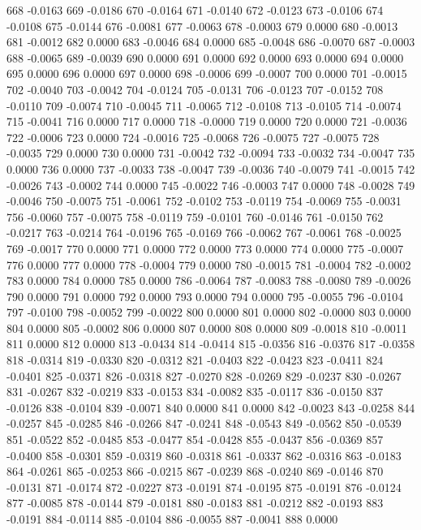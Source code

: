 668 -0.0163
669 -0.0186
670 -0.0164
671 -0.0140
672 -0.0123
673 -0.0106
674 -0.0108
675 -0.0144
676 -0.0081
677 -0.0063
678 -0.0003
679 0.0000
680 -0.0013
681 -0.0012
682 0.0000
683 -0.0046
684 0.0000
685 -0.0048
686 -0.0070
687 -0.0003
688 -0.0065
689 -0.0039
690 0.0000
691 0.0000
692 0.0000
693 0.0000
694 0.0000
695 0.0000
696 0.0000
697 0.0000
698 -0.0006
699 -0.0007
700 0.0000
701 -0.0015
702 -0.0040
703 -0.0042
704 -0.0124
705 -0.0131
706 -0.0123
707 -0.0152
708 -0.0110
709 -0.0074
710 -0.0045
711 -0.0065
712 -0.0108
713 -0.0105
714 -0.0074
715 -0.0041
716 0.0000
717 0.0000
718 -0.0000
719 0.0000
720 0.0000
721 -0.0036
722 -0.0006
723 0.0000
724 -0.0016
725 -0.0068
726 -0.0075
727 -0.0075
728 -0.0035
729 0.0000
730 0.0000
731 -0.0042
732 -0.0094
733 -0.0032
734 -0.0047
735 0.0000
736 0.0000
737 -0.0033
738 -0.0047
739 -0.0036
740 -0.0079
741 -0.0015
742 -0.0026
743 -0.0002
744 0.0000
745 -0.0022
746 -0.0003
747 0.0000
748 -0.0028
749 -0.0046
750 -0.0075
751 -0.0061
752 -0.0102
753 -0.0119
754 -0.0069
755 -0.0031
756 -0.0060
757 -0.0075
758 -0.0119
759 -0.0101
760 -0.0146
761 -0.0150
762 -0.0217
763 -0.0214
764 -0.0196
765 -0.0169
766 -0.0062
767 -0.0061
768 -0.0025
769 -0.0017
770 0.0000
771 0.0000
772 0.0000
773 0.0000
774 0.0000
775 -0.0007
776 0.0000
777 0.0000
778 -0.0004
779 0.0000
780 -0.0015
781 -0.0004
782 -0.0002
783 0.0000
784 0.0000
785 0.0000
786 -0.0064
787 -0.0083
788 -0.0080
789 -0.0026
790 0.0000
791 0.0000
792 0.0000
793 0.0000
794 0.0000
795 -0.0055
796 -0.0104
797 -0.0100
798 -0.0052
799 -0.0022
800 0.0000
801 0.0000
802 -0.0000
803 0.0000
804 0.0000
805 -0.0002
806 0.0000
807 0.0000
808 0.0000
809 -0.0018
810 -0.0011
811 0.0000
812 0.0000
813 -0.0434
814 -0.0414
815 -0.0356
816 -0.0376
817 -0.0358
818 -0.0314
819 -0.0330
820 -0.0312
821 -0.0403
822 -0.0423
823 -0.0411
824 -0.0401
825 -0.0371
826 -0.0318
827 -0.0270
828 -0.0269
829 -0.0237
830 -0.0267
831 -0.0267
832 -0.0219
833 -0.0153
834 -0.0082
835 -0.0117
836 -0.0150
837 -0.0126
838 -0.0104
839 -0.0071
840 0.0000
841 0.0000
842 -0.0023
843 -0.0258
844 -0.0257
845 -0.0285
846 -0.0266
847 -0.0241
848 -0.0543
849 -0.0562
850 -0.0539
851 -0.0522
852 -0.0485
853 -0.0477
854 -0.0428
855 -0.0437
856 -0.0369
857 -0.0400
858 -0.0301
859 -0.0319
860 -0.0318
861 -0.0337
862 -0.0316
863 -0.0183
864 -0.0261
865 -0.0253
866 -0.0215
867 -0.0239
868 -0.0240
869 -0.0146
870 -0.0131
871 -0.0174
872 -0.0227
873 -0.0191
874 -0.0195
875 -0.0191
876 -0.0124
877 -0.0085
878 -0.0144
879 -0.0181
880 -0.0183
881 -0.0212
882 -0.0193
883 -0.0191
884 -0.0114
885 -0.0104
886 -0.0055
887 -0.0041
888 0.0000
